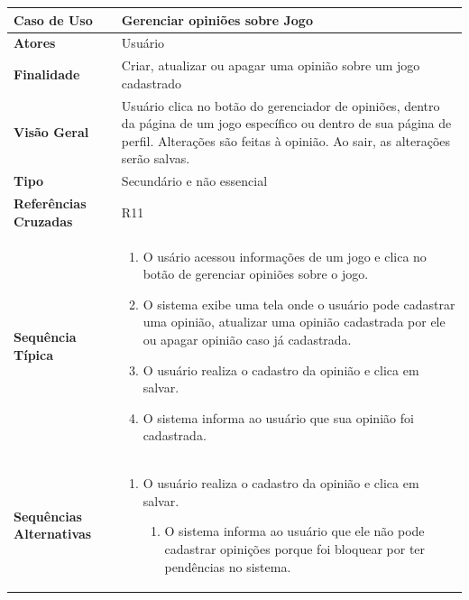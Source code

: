 \documentclass[a4paper,11pt]{article}
\begin{document}
\begin{table}[H]
		\begin{tabularx}{\textwidth}{|l|X|}
		\hline
			\textbf{Caso de Uso} &  Gerenciar opiniões sobre Jogo \\ \hline
			\textbf{Atores} &  Usuário  \\ \hline
			\textbf{Finalidade} &  Criar, atualizar ou apagar uma opinião sobre um jogo cadastrado  \\ \hline
			\textbf{Visão Geral} & Usuário clica no botão do gerenciador de opiniões, dentro
da página de um jogo específico ou dentro de sua página de perfil. Alterações são
feitas à opinião. Ao sair, as alterações serão salvas.  \\ \hline
			\textbf{Tipo} &  Secundário e não essencial\\ \hline
			\textbf{Referências Cruzadas} &  R11 \\ \hline
			\textbf{Sequência Típica} & 
			\begin{enumerate}
			\item O usário acessou informações de um jogo e clica no botão de gerenciar opiniões sobre o jogo.
			\item O sistema exibe uma tela onde o usuário pode cadastrar uma opinião, atualizar uma opinião cadastrada por ele ou apagar opinião caso já cadastrada.
			\item O usuário realiza o cadastro da opinião e clica em salvar.
			\item O sistema informa ao usuário que sua opinião foi cadastrada.
			\end{enumerate} \\ \hline
			\textbf{Sequências Alternativas} & 
			\begin{enumerate}
			\item O usuário realiza o cadastro da opinião e clica em salvar.
			\begin{enumerate}
			\item O sistema informa ao usuário que ele não pode cadastrar opinições porque foi bloquear por ter pendências no sistema.
			\end{enumerate}
			\end{enumerate} \\ \hline
		\end{tabularx}
\end{table}
\end{document}
